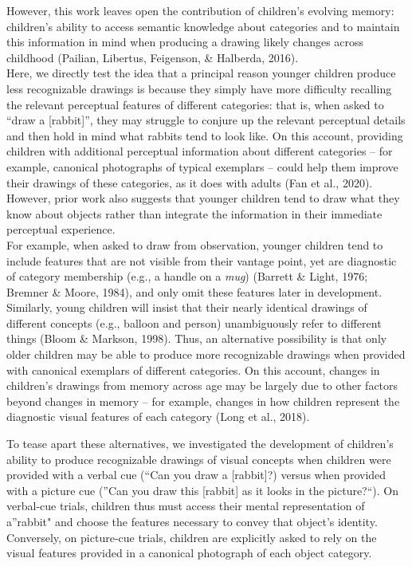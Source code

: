 \documentclass[
  english,
  man]{apa6}
\begin{document}
However, this work leaves open the contribution of children's evolving memory: children's ability to access semantic knowledge about categories and to maintain this information in mind when producing a drawing likely changes across childhood (Pailian, Libertus, Feigenson, \& Halberda, 2016).\\
Here, we directly test the idea that a principal reason younger children produce less recognizable drawings is because they simply have more difficulty recalling the relevant perceptual features of different categories: that is, when asked to \enquote{draw a {[}rabbit{]}}, they may struggle to conjure up the relevant perceptual details and then hold in mind what rabbits tend to look like.
On this account, providing children with additional perceptual information about different categories -- for example, canonical photographs of typical exemplars -- could help them improve their drawings of these categories, as it does with adults (Fan et al., 2020).
However, prior work also suggests that younger children tend to draw what they know about objects rather than integrate the information in their immediate perceptual experience.\\
For example, when asked to draw from observation, younger children tend to include features that are not visible from their vantage point, yet are diagnostic of category membership (e.g., a handle on a \textit{mug}) (Barrett \& Light, 1976; Bremner \& Moore, 1984), and only omit these features later in development.
Similarly, young children will insist that their nearly identical drawings of different concepts (e.g., balloon and person) unambiguously refer to different things (Bloom \& Markson, 1998).
Thus, an alternative possibility is that only older children may be able to produce more recognizable drawings when provided with canonical exemplars of different categories.
On this account, changes in children's drawings from memory across age may be largely due to other factors beyond changes in memory -- for example, changes in how children represent the diagnostic visual features of each category (Long et al., 2018).

To tease apart these alternatives, we investigated the development of children's ability to produce recognizable drawings of visual concepts when children were provided with a verbal cue (\enquote{Can you draw a {[}rabbit{]}?) versus when provided with a picture cue (}Can you draw this {[}rabbit{]} as it looks in the picture?\enquote{). On verbal-cue trials, children thus must access their mental representation of a}rabbit" and choose the features necessary to convey that object's identity. Conversely, on picture-cue trials, children are explicitly asked to rely on the visual features provided in a canonical photograph of each object category.
\end{document}
